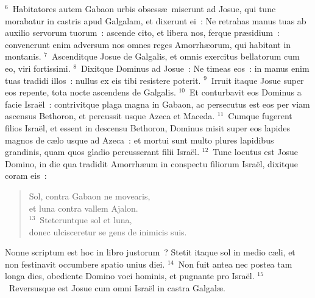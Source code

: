${}^{6}$~Habitatores autem Gabaon urbis obsess\ae\ miserunt ad Josue, qui tunc morabatur in castris apud Galgalam, et dixerunt ei~: Ne retrahas manus tuas ab auxilio servorum tuorum~: ascende cito, et libera nos, ferque pr\ae sidium~: convenerunt enim adversum nos omnes reges Amorrh\ae orum, qui habitant in montanis.
${}^{7}$~Ascenditque Josue de Galgalis, et omnis exercitus bellatorum cum eo, viri fortissimi.
${}^{8}$~Dixitque Dominus ad Josue~: Ne timeas eos~: in manus enim tuas tradidi illos~: nullus ex eis tibi resistere poterit.
${}^{9}$~Irruit itaque Josue super eos repente, tota nocte ascendens de Galgalis.
${}^{10}$~Et conturbavit eos Dominus a facie Isra\"el~: contrivitque plaga magna in Gabaon, ac persecutus est eos per viam ascensus Bethoron, et percussit usque Azeca et Maceda.
${}^{11}$~Cumque fugerent filios Isra\"el, et essent in descensu Bethoron, Dominus misit super eos lapides magnos de c\ae lo usque ad Azeca~: et mortui sunt multo plures lapidibus grandinis, quam quos gladio percusserant filii Isra\"el.
${}^{12}$~Tunc locutus est Josue Domino, in die qua tradidit Amorrh\ae um in conspectu filiorum Isra\"el, dixitque coram eis~: \begin{flushleft}\begin{verse}Sol, contra Gabaon ne movearis,\\ et luna contra vallem Ajalon.\\
${}^{13}$~Steteruntque sol et luna,\\ donec ulcisceretur se gens de inimicis suis.\end{verse}\end{flushleft}

 Nonne scriptum est hoc in libro justorum~? Stetit itaque sol in medio c\ae li, et non festinavit occumbere spatio unius diei.
${}^{14}$~Non fuit antea nec postea tam longa dies, obediente Domino voci hominis, et pugnante pro Isra\"el.
${}^{15}$~Reversusque est Josue cum omni Isra\"el in castra Galgal\ae .


